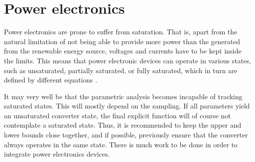 \section{Power electronics}
Power electronics are prone to suffer from saturation. That is, apart from the natural limitation of not being able to provide more power than the generated from the renewable energy source, voltages and currents have to be kept inside the limits. This means that power electronic devices can operate in various states, such as unsaturated, partially saturated, or fully saturated, which in turn are defined by different equations \cite{song2021}. 

It may very well be that the parametric analysis becomes incapable of tracking saturated states. This will mostly depend on the sampling. If all parameters yield an unsaturated converter state, the final explicit function will of course not contemplate a saturated state. Thus, it is recommended to keep the upper and lower bounds close together, and if possible, previously ensure that the converter always operates in the same state. There is much work to be done in order to integrate power electronics devices.  


